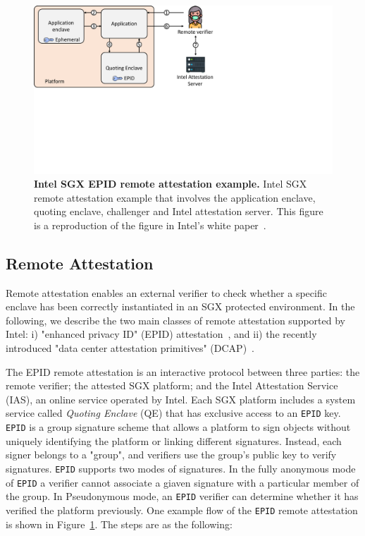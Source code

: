 \begin{figure}[t]
  \centering
    \includegraphics[trim={0 9cm 12cm 0},clip,width=0.9\linewidth]{chapters/background/figures/remote_attestation.pdf}
    \caption[Intel SGX EPID remote attestation example]{\textbf{Intel SGX EPID remote attestation example.} Intel SGX remote attestation example that involves the application enclave, quoting enclave, challenger and Intel attestation server. This figure is a reproduction of the figure in Intel's white paper~\cite{attestation_primitive_all}.}
    \label{fig:ra_bg}
\end{figure}

\subsection{Remote Attestation}
\label{ch:background:SGX:remote}

Remote attestation enables an external verifier to check whether a specific enclave has been correctly instantiated in an SGX protected environment. In the following, we describe the two main classes of remote attestation supported by Intel: i) "enhanced privacy ID" (EPID) attestation~\cite{epid_attestation}, and ii) the recently introduced "data center attestation primitives" (DCAP)~\cite{DCAP}. 


The EPID remote attestation is an interactive protocol between three parties: the remote verifier; the attested SGX platform; and the Intel Attestation Service (IAS), an online service operated by Intel. Each SGX platform includes a system service called \emph{Quoting Enclave} (QE) that has exclusive access to an \texttt{EPID} key. \texttt{EPID} is a group signature scheme that allows a platform to sign objects without uniquely identifying the platform or linking different signatures. Instead, each signer belongs to a "group", and verifiers use the group's public key to verify signatures. \texttt{EPID} supports two modes of signatures. In the fully anonymous mode of \texttt{EPID} a verifier cannot associate a giaven signature with a particular member of the group. In Pseudonymous mode, an \texttt{EPID} verifier can determine whether it has verified the platform previously.
One example flow of the \texttt{EPID} remote attestation is shown in Figure~\ref{fig:ra_bg}. The steps are as the following:


